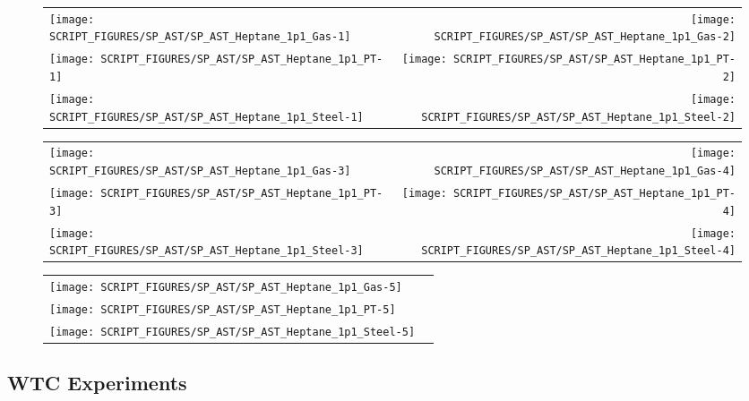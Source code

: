\begin{figure}[p]
\begin{tabular*}{\textwidth}{l@{\extracolsep{\fill}}r}
\texttt{[image: SCRIPT\_FIGURES/SP\_AST/SP\_AST\_Heptane\_1p1\_Gas-1]}   &  \texttt{[image: SCRIPT\_FIGURES/SP\_AST/SP\_AST\_Heptane\_1p1\_Gas-2]}  \\
\texttt{[image: SCRIPT\_FIGURES/SP\_AST/SP\_AST\_Heptane\_1p1\_PT-1]}    &  \texttt{[image: SCRIPT\_FIGURES/SP\_AST/SP\_AST\_Heptane\_1p1\_PT-2]}   \\
\texttt{[image: SCRIPT\_FIGURES/SP\_AST/SP\_AST\_Heptane\_1p1\_Steel-1]} &  \texttt{[image: SCRIPT\_FIGURES/SP\_AST/SP\_AST\_Heptane\_1p1\_Steel-2]}
\end{tabular*}
\label{SP_Heptane_1p1_1m}
\end{figure}

\begin{figure}[p]
\begin{tabular*}{\textwidth}{l@{\extracolsep{\fill}}r}
\texttt{[image: SCRIPT\_FIGURES/SP\_AST/SP\_AST\_Heptane\_1p1\_Gas-3]}   & \texttt{[image: SCRIPT\_FIGURES/SP\_AST/SP\_AST\_Heptane\_1p1\_Gas-4]}  \\
\texttt{[image: SCRIPT\_FIGURES/SP\_AST/SP\_AST\_Heptane\_1p1\_PT-3]}    & \texttt{[image: SCRIPT\_FIGURES/SP\_AST/SP\_AST\_Heptane\_1p1\_PT-4]}   \\
\texttt{[image: SCRIPT\_FIGURES/SP\_AST/SP\_AST\_Heptane\_1p1\_Steel-3]} & \texttt{[image: SCRIPT\_FIGURES/SP\_AST/SP\_AST\_Heptane\_1p1\_Steel-4]}
\end{tabular*}
\label{SP_Heptane_1p1_3m}
\end{figure}

\begin{figure}[p]
\begin{tabular*}{\textwidth}{l@{\extracolsep{\fill}}r}
\texttt{[image: SCRIPT\_FIGURES/SP\_AST/SP\_AST\_Heptane\_1p1\_Gas-5]}   &  \\
\texttt{[image: SCRIPT\_FIGURES/SP\_AST/SP\_AST\_Heptane\_1p1\_PT-5]}    &  \\
\texttt{[image: SCRIPT\_FIGURES/SP\_AST/SP\_AST\_Heptane\_1p1\_Steel-5]} &
\end{tabular*}
\label{SP_Heptane_1p1_5m}
\end{figure}

\clearpage

\subsection{WTC Experiments}

